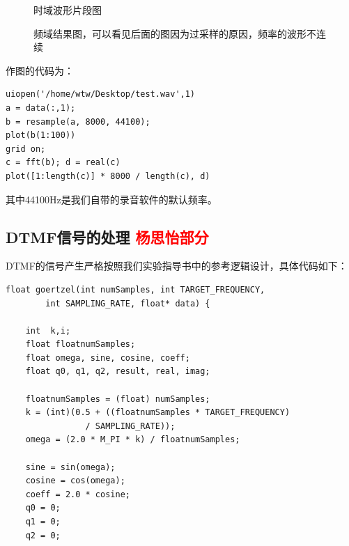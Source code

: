 \documentclass{article}
\begin{document}
\begin{CJK}{UTF8}{gbsn}
\begin{figure}[h!]
\caption{时域波形片段图}
\label{Fig.lable}
\end{figure}\begin{figure}[h!]
\centering
{}
\caption{频域结果图，可以看见后面的图因为过采样的原因，频率的波形不连续}
\label{Fig.lable}
\end{figure}
作图的代码为：
\begin{lstlisting}
uiopen('/home/wtw/Desktop/test.wav',1)
a = data(:,1);
b = resample(a, 8000, 44100);
plot(b(1:100))
grid on;
c = fft(b); d = real(c)
plot([1:length(c)] * 8000 / length(c), d)
\end{lstlisting}
其中44100Hz是我们自带的录音软件的默认频率。
\subsection{DTMF信号的处理 \textcolor{red}{杨思怡部分}}
DTMF的信号产生严格按照我们实验指导书中的参考逻辑设计，具体代码如下：
\begin{lstlisting}
float goertzel(int numSamples, int TARGET_FREQUENCY,
        int SAMPLING_RATE, float* data) {

    int  k,i;
    float floatnumSamples;
    float omega, sine, cosine, coeff;
    float q0, q1, q2, result, real, imag;

    floatnumSamples = (float) numSamples;
    k = (int)(0.5 + ((floatnumSamples * TARGET_FREQUENCY)
                / SAMPLING_RATE));
    omega = (2.0 * M_PI * k) / floatnumSamples;

    sine = sin(omega);
    cosine = cos(omega);
    coeff = 2.0 * cosine;
    q0 = 0;
    q1 = 0;
    q2 = 0;


\end{lstlisting}
\end{CJK}
\end{document}
